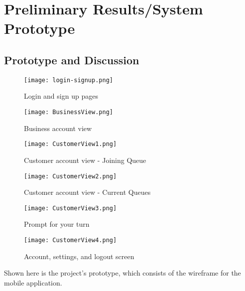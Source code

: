 \chapter{Preliminary Results/System Prototype}

\section{Prototype and Discussion}

\begin{figure}[h]                
   \centering                    
   \caption{Login and sign up pages}
   \texttt{[image: login-signup.png]}       
    \label{fig:loginsignup}
\end{figure}

\begin{figure}[h]               
   \centering                    
   \caption{Business account view}
   \texttt{[image: BusinessView.png]}       
    \label{fig:businessview}
\end{figure}

\begin{figure}[h]                
   \centering                    
   \caption{Customer account view - Joining Queue}
   \texttt{[image: CustomerView1.png]}       
    \label{fig:joinqueue}
\end{figure}

\begin{figure}[h]                
   \centering                    
   \caption{Customer account view - Current Queues}
   \texttt{[image: CustomerView2.png]}       
    \label{fig:queuecomparison}
\end{figure}

\begin{figure}[h]                
   \centering                    
   \caption{Prompt for your turn}
   \texttt{[image: CustomerView3.png]}       
    \label{fig:queuenotification}
\end{figure}

\begin{figure}[h]                
   \centering                    
   \caption{Account, settings, and logout screen}
   \texttt{[image: CustomerView4.png]}       
    \label{fig:logout}
\end{figure}

Shown here is the project's prototype, which consists of the wireframe for the mobile application. 

